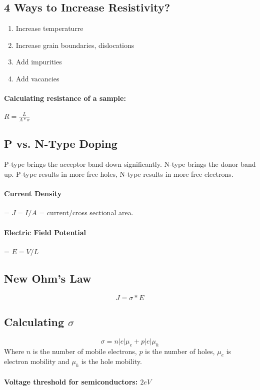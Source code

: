 \documentclass[a4paper,12pt]{report}
\begin{document}
\subsection{4 Ways to Increase Resistivity?}
\begin{enumerate}
\item Increase temperaturre
\item Increase grain boundaries, dislocations
\item Add impurities
\item Add vacancies
\end{enumerate}

\paragraph{Calculating resistance of a sample: } $R = \frac{L}{A*\sigma}$

\subsection{P vs. N-Type Doping}
P-type brings the acceptor band down significantly. N-type brings the donor band up. P-type results in more free holes, N-type results in more free electrons. 


\paragraph{Current Density} = $J = I/A$ = current/cross sectional area.
\paragraph{Electric Field Potential} = $E = V/L$

\subsection{New Ohm's Law}
$$J = \sigma*E$$

\subsection{Calculating $\sigma$}
$$\sigma = n|e|\mu_e + p|e|\mu_h$$
Where $n$ is the number of mobile electrons, $p$ is the number of holes, $\mu_e$ is electron mobility and $\mu_h$ is the hole mobility.

\paragraph{Voltage threshold for semiconductors: $2eV$}
\end{document}
